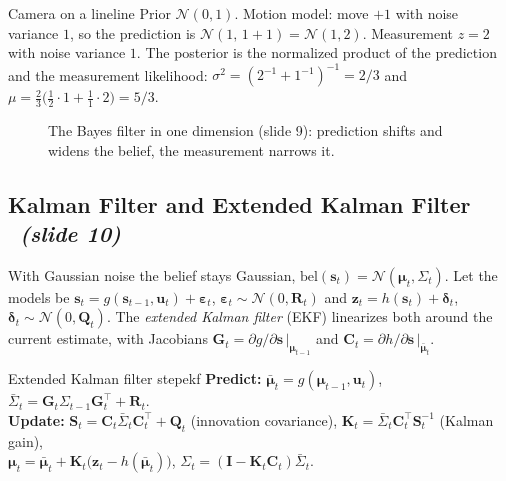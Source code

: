 \documentclass[11pt,a4paper]{article}
\newcommand{\slrs}[1]{\texorpdfstring{\ \emph{(slide #1)}}{ (slide #1)}}
\newcommand{\bz}{\mathbf{z}}
\newcommand{\bu}{\mathbf{u}}
\newcommand{\bs}{\mathbf{s}}
\newcommand{\bK}{\mathbf{K}}
\newcommand{\bS}{\mathbf{S}}
\newcommand{\bG}{\mathbf{G}}
\newcommand{\bC}{\mathbf{C}}
\newcommand{\bI}{\mathbf{I}}
\newcommand{\N}{\mathcal{N}}
\begin{document}
\begin{example}{Camera on a line}{line}
Prior $\N(0,1)$. Motion model: move $+1$ with noise variance $1$, so the prediction is $\N(1,\,1+1)=\N(1,2)$. Measurement $z=2$ with noise variance $1$. The posterior is the normalized product of the prediction and the measurement likelihood: $\sigma^2=(2^{-1}+1^{-1})^{-1}=2/3$ and $\mu=\tfrac{2}{3}\big(\tfrac{1}{2}\cdot 1+\tfrac{1}{1}\cdot 2\big)=5/3$.
\end{example}
\begin{figure}[htbp]\centering
{}
\caption{The Bayes filter in one dimension (slide 9): prediction shifts and widens the belief, the measurement narrows it.}
\end{figure}

\subsection{Kalman Filter and Extended Kalman Filter \slrs{10}}
With Gaussian noise the belief stays Gaussian, $\mathrm{bel}(\bs_t)=\N(\boldsymbol\mu_t,\Sigma_t)$. Let the models be $\bs_t=g(\bs_{t-1},\bu_t)+\boldsymbol\varepsilon_t$, $\boldsymbol\varepsilon_t\sim\N(0,\mathbf R_t)$ and $\bz_t=h(\bs_t)+\boldsymbol\delta_t$, $\boldsymbol\delta_t\sim\N(0,\mathbf Q_t)$. The \emph{extended Kalman filter} (EKF) linearizes both around the current estimate, with Jacobians $\bG_t=\partial g/\partial\bs\,|_{\boldsymbol\mu_{t-1}}$ and $\bC_t=\partial h/\partial\bs\,|_{\bar{\boldsymbol\mu}_t}$.

\begin{algorithm}{Extended Kalman filter step}{ekf}
\textbf{Predict:} $\bar{\boldsymbol\mu}_t=g(\boldsymbol\mu_{t-1},\bu_t)$, \quad $\bar\Sigma_t=\bG_t\Sigma_{t-1}\bG_t^\top+\mathbf R_t$.\\[3pt]
\textbf{Update:} $\bS_t=\bC_t\bar\Sigma_t\bC_t^\top+\mathbf Q_t$ (innovation covariance), \quad $\bK_t=\bar\Sigma_t\bC_t^\top\bS_t^{-1}$ (Kalman gain),\\
$\boldsymbol\mu_t=\bar{\boldsymbol\mu}_t+\bK_t\big(\bz_t-h(\bar{\boldsymbol\mu}_t)\big)$, \quad $\Sigma_t=(\bI-\bK_t\bC_t)\bar\Sigma_t$.
\end{algorithm}
\end{document}
